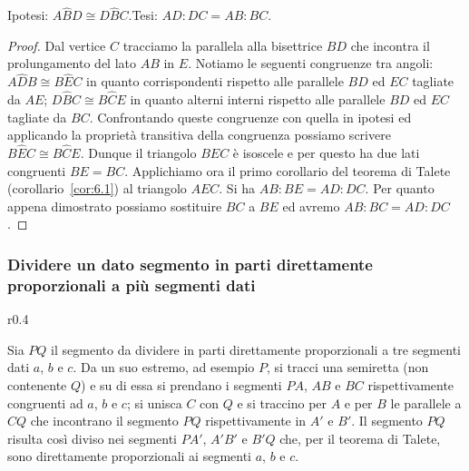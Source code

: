 \noindent\begin{minipage}{0.65\textwidth}\parindent15pt
\noindent Ipotesi: $A\widehat{B}D\cong D\widehat{B}C$.\tab\tab Tesi: $AD : DC = AB : BC$.

\begin{proof}
Dal vertice $C$ tracciamo la parallela alla bisettrice $BD$ che incontra il prolungamento del lato $AB$ in $E$. Notiamo le seguenti congruenze tra angoli: $A\widehat{D}B\cong B\widehat{E}C$ in quanto corrispondenti rispetto alle parallele $BD$ ed $EC$ tagliate da $AE$; $D\widehat{B}C\cong B\widehat{C}E$ in quanto alterni interni rispetto alle parallele $BD$ ed $EC$ tagliate da $BC$.
Confrontando queste congruenze con quella in ipotesi ed applicando la proprietà transitiva della congruenza possiamo scrivere $B\widehat{E}C\cong B\widehat{C}E$. Dunque il triangolo $BEC$ è isoscele e per questo ha due lati congruenti $BE = BC$.
Applichiamo ora il primo corollario del teorema di Talete (corollario~\ref{cor:6.1}) al triangolo $AEC$. Si ha $AB : BE = AD : DC$. 
Per quanto appena dimostrato possiamo sostituire $BC$ a $BE$ ed avremo $AB : BC = AD : DC$.
\end{proof}
\end{minipage}\hfil
\begin{minipage}{0.35\textwidth}
	\centering
\end{minipage}\vspace{5pt}

\subsubsection{Dividere un dato segmento in parti direttamente proporzionali a più segmenti dati}
\nopagebreak
\begin{wrapfigure}{r}{0.4\textwidth}
	\centering
\end{wrapfigure}
Sia $PQ$ il segmento da dividere in parti direttamente proporzionali a tre segmenti dati $a$, $b$ e $c$.
Da un suo estremo, ad esempio $P$, si tracci una semiretta (non contenente $Q$) e su di essa si prendano i segmenti $PA$, $AB$ e $BC$ rispettivamente congruenti ad $a$, $b$ e $c$; si unisca $C$ con $Q$ e si traccino per $A$ e per $B$ le parallele a $CQ$ che incontrano il segmento $PQ$ rispettivamente in $A'$ e $B'$. Il segmento $PQ$ risulta così diviso nei segmenti $PA'$, $A'B'$ e $B'Q$ che, per il teorema di Talete, sono direttamente proporzionali ai segmenti $a$, $b$ e $c$.

